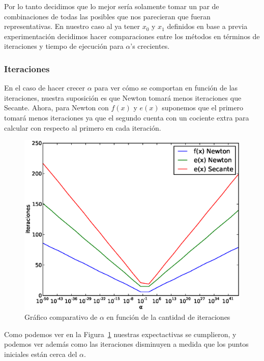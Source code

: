 Por lo tanto decidimos que lo mejor sería solamente tomar un par de combinaciones de todas las posibles que nos parecieran que fueran representativas. En nuestro caso al ya tener $x_0$ y $x_1$ definidos en base a previa experimentación decidimos hacer comparaciones entre los métodos en términos de iteraciones y tiempo de ejecución para $\alpha$'s crecientes.

\subsubsection{Iteraciones} %
\label{ssub:iteraciones}

En el caso de hacer crecer $\alpha$ para ver cómo se comportan en función de las iteraciones, nuestra suposición es que Newton tomará menos iteraciones que Secante. Ahora, para Newton con $f(x)$ y $e(x)$ suponemos que el primero tomará menos iteraciones ya que el segundo cuenta con un cociente extra para calcular con respecto al primero en cada iteración.

\begin{figure}[!htbp]
  \begin{center}
    \includegraphics[scale=0.5]{graficos/new/comparacion_iteraciones.eps}
    \caption{\label{fig:comparacion_iteraciones} Gráfico comparativo de $\alpha$ en función de la cantidad de iteraciones}
  \end{center}
\end{figure}

Como podemos ver en la Figura~\ref{fig:comparacion_iteraciones} nuestras expectactivas se cumplieron, y podemos ver además como las iteraciones disminuyen a medida que los puntos iniciales están cerca del $\alpha$.

